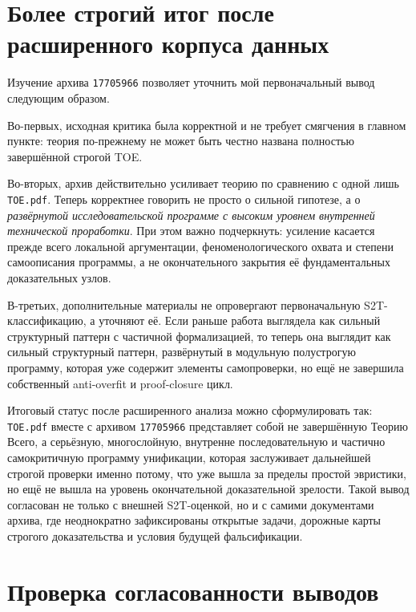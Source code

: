 \documentclass[12pt,a4paper]{article}
\begin{document}
\section{Более строгий итог после расширенного корпуса данных}

Изучение архива \texttt{17705966} позволяет уточнить мой первоначальный вывод следующим образом.

Во-первых, исходная критика была корректной и не требует смягчения в главном пункте: теория по-прежнему не может быть честно названа полностью завершённой строгой TOE.

Во-вторых, архив действительно усиливает теорию по сравнению с одной лишь \texttt{TOE.pdf}. Теперь корректнее говорить не просто о сильной гипотезе, а о \emph{развёрнутой исследовательской программе с высоким уровнем внутренней технической проработки}. При этом важно подчеркнуть: усиление касается прежде всего локальной аргументации, феноменологического охвата и степени самоописания программы, а не окончательного закрытия её фундаментальных доказательных узлов.

В-третьих, дополнительные материалы не опровергают первоначальную S2T-классификацию, а уточняют её. Если раньше работа выглядела как сильный структурный паттерн с частичной формализацией, то теперь она выглядит как сильный структурный паттерн, развёрнутый в модульную полустрогую программу, которая уже содержит элементы самопроверки, но ещё не завершила собственный anti-overfit и proof-closure цикл.

Итоговый статус после расширенного анализа можно сформулировать так: \texttt{TOE.pdf} вместе с архивом \texttt{17705966} представляет собой не завершённую Теорию Всего, а серьёзную, многослойную, внутренне последовательную и частично самокритичную программу унификации, которая заслуживает дальнейшей строгой проверки именно потому, что уже вышла за пределы простой эвристики, но ещё не вышла на уровень окончательной доказательной зрелости. Такой вывод согласован не только с внешней S2T-оценкой, но и с самими документами архива, где неоднократно зафиксированы открытые задачи, дорожные карты строгого доказательства и условия будущей фальсификации.


\section{Проверка согласованности выводов}
\end{document}
